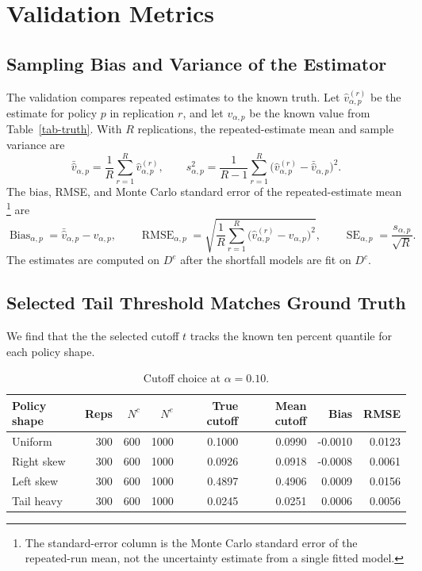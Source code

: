 \documentclass[11pt]{article}
\newcommand{\Dc}{D^{c}}
\newcommand{\De}{D^{e}}
\begin{document}
\section{Validation Metrics}

\subsection{Sampling Bias and Variance of the Estimator}

The validation compares repeated estimates to the known truth.  Let
\(\hat v_{\alpha,p}^{(r)}\) be the estimate for policy \(p\) in replication
\(r\), and let \(v_{\alpha,p}\) be the known value from Table~\ref{tab-truth}.
With \(R\) replications, the repeated-estimate mean and sample variance are
\[
  \bar{\hat v}_{\alpha,p}
  =
  \frac{1}{R}\sum_{r=1}^R \hat v_{\alpha,p}^{(r)},
  \qquad
  s_{\alpha,p}^2
  =
  \frac{1}{R-1}\sum_{r=1}^R
  \bigl(\hat v_{\alpha,p}^{(r)}-\bar{\hat v}_{\alpha,p}\bigr)^2.
\]
The bias, RMSE, and Monte Carlo standard error of the repeated-estimate mean
\footnote{The standard-error column is the Monte Carlo standard error of the
repeated-run mean, not the uncertainty estimate from a single fitted model.}
are
\[
  \operatorname{Bias}_{\alpha,p}
  =
  \bar{\hat v}_{\alpha,p}-v_{\alpha,p},
  \qquad
  \operatorname{RMSE}_{\alpha,p}
  =
  \sqrt{
  \frac{1}{R}\sum_{r=1}^R
  \bigl(\hat v_{\alpha,p}^{(r)}-v_{\alpha,p}\bigr)^2
  },
  \qquad
  \operatorname{SE}_{\alpha,p}
  =
  \frac{s_{\alpha,p}}{\sqrt{R}}.
\]
The estimates are computed on \(\De\) after the shortfall models are fit on
\(\Dc\).

\subsection{Selected Tail Threshold Matches Ground Truth}

We find that the the selected cutoff $t$ tracks the known ten
percent quantile for each policy shape.

\begin{table}[H]
\centering
\small
\begin{tabular}{@{}lrrrrrrr@{}}
\toprule
Policy shape & Reps & \(N^c\) & \(N^e\) & True cutoff & Mean cutoff & Bias & RMSE \\
\midrule
Uniform & 300 & 600 & 1000 & 0.1000 & 0.0990 & -0.0010 & 0.0123 \\
Right skew & 300 & 600 & 1000 & 0.0926 & 0.0918 & -0.0008 & 0.0061 \\
Left skew & 300 & 600 & 1000 & 0.4897 & 0.4906 & 0.0009 & 0.0156 \\
Tail heavy & 300 & 600 & 1000 & 0.0245 & 0.0251 & 0.0006 & 0.0056 \\
\bottomrule
\end{tabular}
\caption{Cutoff choice at \(\alpha=0.10\).}
\label{tab-cutoff}
\end{table}
\end{document}
